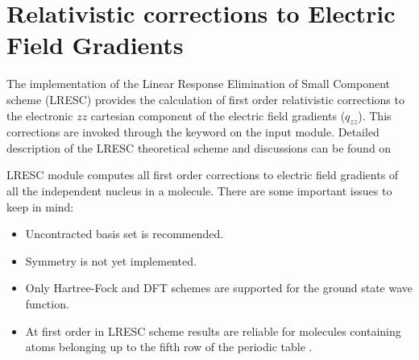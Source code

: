 \section{Relativistic corrections to Electric Field Gradients}\label{sec:lresc-efg}

The implementation of the Linear Response Elimination of Small Component scheme (LRESC) provides the calculation of first order relativistic corrections to the electronic $zz$ cartesian component of the electric field gradients ($q_{zz}$). This corrections are invoked through the keyword  on the  input module. Detailed description of the LRESC theoretical scheme and discussions can be found on

\begin{center}
\end{center}

LRESC module computes all first order corrections to electric field gradients of all the independent nucleus in a molecule.
There are some important issues to keep in mind:
\begin{center}
\begin{itemize}{}{}
\item Uncontracted basis set is recommended. 
\item Symmetry is not yet implemented.
\item Only Hartree-Fock and DFT schemes are supported for the ground state wave function.
\item At first order in LRESC scheme results are reliable for molecules containing atoms belonging up to the fifth row of the periodic table \cite{melomaldo19,aucarmaldomelo21}. 
\end{itemize}
\end{center}


